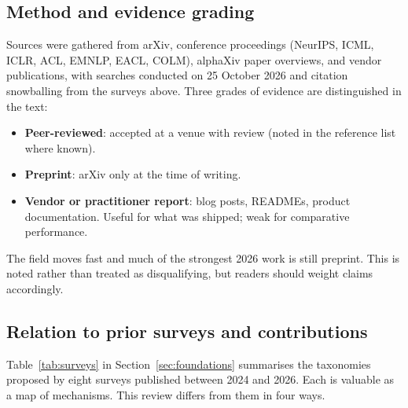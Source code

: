 \documentclass[11pt]{article}
\begin{document}
\subsection{Method and evidence grading}
\label{sec:method}

Sources were gathered from arXiv, conference proceedings (NeurIPS, ICML, ICLR, ACL, EMNLP, EACL, COLM), alphaXiv paper overviews, and vendor publications, with searches conducted on 25 October 2026 and citation snowballing from the surveys above. Three grades of evidence are distinguished in the text:
\begin{itemize}
\item \textbf{Peer-reviewed}: accepted at a venue with review (noted in the reference list where known).
\item \textbf{Preprint}: arXiv only at the time of writing.
\item \textbf{Vendor or practitioner report}: blog posts, READMEs, product documentation. Useful for what was shipped; weak for comparative performance.
\end{itemize}
The field moves fast and much of the strongest 2026 work is still preprint. This is noted rather than treated as disqualifying, but readers should weight claims accordingly.

\subsection{Relation to prior surveys and contributions}

Table~\ref{tab:surveys} in Section~\ref{sec:foundations} summarises the taxonomies proposed by eight surveys published between 2024 and 2026. Each is valuable as a map of mechanisms. This review differs from them in four ways.
\end{document}
